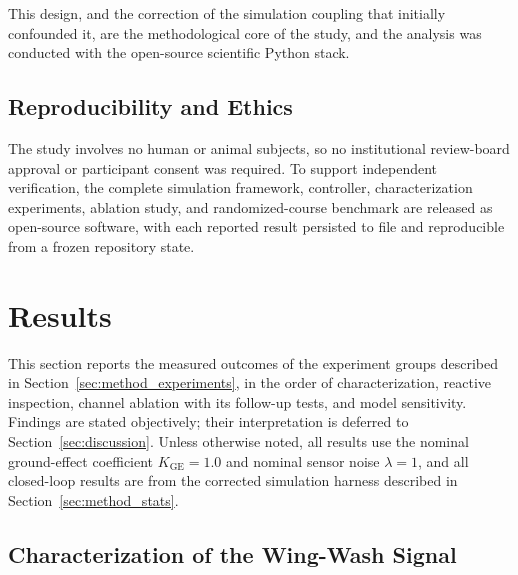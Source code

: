 \documentclass[final,5p,times]{elsarticle}
\begin{document}
This design, and the correction of the simulation coupling that initially confounded it, are the methodological core of the study, and the analysis was conducted with the open-source scientific Python stack.

\subsection{Reproducibility and Ethics}
\label{sec:method_repro}

The study involves no human or animal subjects, so no institutional review-board approval or participant consent was required. To support independent verification, the complete simulation framework, controller, characterization experiments, ablation study, and randomized-course benchmark are released as open-source software, with each reported result persisted to file and reproducible from a frozen repository state.

\section{Results}
\label{sec:results}

This section reports the measured outcomes of the experiment groups described in Section~\ref{sec:method_experiments}, in the order of characterization, reactive inspection, channel ablation with its follow-up tests, and model sensitivity. Findings are stated objectively; their interpretation is deferred to Section~\ref{sec:discussion}. Unless otherwise noted, all results use the nominal ground-effect coefficient $K_{\mathrm{GE}} = 1.0$ and nominal sensor noise $\lambda = 1$, and all closed-loop results are from the corrected simulation harness described in Section~\ref{sec:method_stats}.

\subsection{Characterization of the Wing-Wash Signal}
\label{sec:results_sensor}
\end{document}
